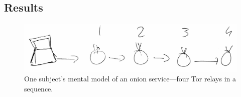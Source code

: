 \subsection{Results}

\begin{figure}
\centering
\includegraphics[width=0.8\linewidth]{figures/os-sketch.pdf}
\caption{One subject's mental model of an onion service---four Tor relays in a
sequence.}
\label{fig:os-sketch}
\end{figure}
